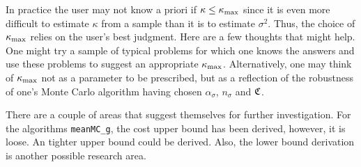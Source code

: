 \documentclass{iitthesis}
\theoremstyle{definition}
\begin{document}
In practice the user may not know a priori if $\kappa \le \kappa_{\max}$ since it is even more difficult to estimate $\kappa$ from a sample than it is to estimate $\sigma^2$. Thus, the choice of $\kappa_{\max}$ relies on the user's best judgment.  Here are a few thoughts that might help.  One might try a sample of typical problems for which one knows the answers and use these problems to suggest an appropriate $\kappa_{\max}$.  Alternatively, one may think of $\kappa_{\max}$ not as a parameter to be prescribed, but as a reflection of the robustness of one's Monte Carlo algorithm having chosen $\alpha_\sigma$, $n_\sigma$ and $\mathfrak{C}$. 

%
%


There are a couple of areas that suggest themselves for further investigation. For the algorithms {\tt meanMC\_g}, the cost upper bound has been derived, however, it is loose. An tighter upper bound could be derived. Also, the lower bound derivation is another possible research area. 
\end{document}

